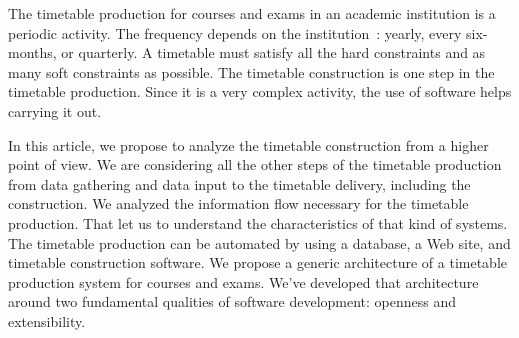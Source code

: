 The timetable production for courses and exams in an academic
institution is a periodic activity. The frequency depends on the
institution~: yearly, every six-months, or quarterly. A timetable
must satisfy all the hard constraints and as many soft constraints
as possible. The timetable construction is one step in the
timetable production. Since it is a very complex activity, the use
of software helps carrying it out.


In this article, we propose to analyze the timetable construction
from a higher point of view. We are considering all the other
steps of the timetable production from data gathering and data
input to the timetable delivery, including the construction. We
analyzed the information flow necessary for the timetable
production. That let us to understand the characteristics of that
kind of systems. The timetable production can be automated by
using a database, a Web site, and timetable construction software.
We propose a generic architecture of a timetable production system
for courses and exams. We've developed that architecture around
two fundamental qualities of software development: openness and
extensibility.
